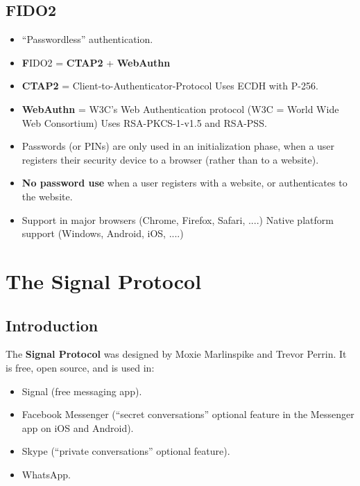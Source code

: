 \documentclass[12pt,titlepage]{article}
\let\stdsection\section
\renewcommand\section{\clearpage\stdsection}
\begin{document}
\subsection{FIDO2}
\begin{itemize}
	\item ``Passwordless'' authentication.
	\item \textbf{F}IDO2 = \textbf{CTAP2} + \textbf{WebAuthn}
	\item \textbf{CTAP2} = Client-to-Authenticator-Protocol Uses ECDH with P-256.
	\item \textbf{WebAuthn} = W3C’s Web Authentication protocol (W3C = World Wide Web Consortium) Uses RSA-PKCS-1-v1.5 and RSA-PSS.
	\item Passwords (or PINs) are only used in an initialization phase, when a user registers their security device to a browser (rather than to a website).
	\item \textbf{No password use} when a user registers with a website, or authenticates to the website.
	\item Support in major browsers (Chrome, Firefox, Safari, ....) Native platform support (Windows, Android, iOS, ....)
\end{itemize}

\section{The Signal Protocol}
\subsection{Introduction}
The \textbf{Signal Protocol} was designed by Moxie Marlinspike and Trevor Perrin. It is free, open source, and is used in:\begin{itemize}
	\item Signal (free messaging app).
	\item Facebook Messenger (``secret conversations'' optional feature in the Messenger app on iOS and Android).
	\item Skype (``private conversations'' optional feature).
	\item WhatsApp.
\end{itemize}
\end{document}
